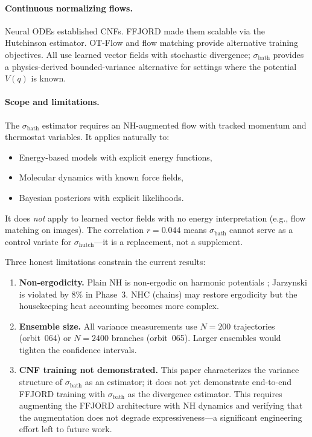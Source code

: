 \documentclass[11pt]{article}
\newcommand{\sbath}{\sigma_{\mathrm{bath}}}
\newcommand{\shutch}{\sigma_{\mathrm{hutch}}}
\begin{document}
\paragraph{Continuous normalizing flows.}
Neural ODEs \citep{chen2018neural} established CNFs. FFJORD
\citep{grathwohl2019ffjord} made them scalable via the Hutchinson estimator.
OT-Flow \citep{onken2021ot} and flow matching \citep{lipman2023flow} provide
alternative training objectives. All use learned vector fields with stochastic
divergence; $\sbath$ provides a physics-derived bounded-variance alternative
for settings where the potential $V(q)$ is known.

\paragraph{Scope and limitations.}
The $\sbath$ estimator requires an NH-augmented flow with tracked momentum and
thermostat variables. It applies naturally to:
\begin{itemize}[leftmargin=*, itemsep=1pt]
  \item Energy-based models with explicit energy functions,
  \item Molecular dynamics with known force fields,
  \item Bayesian posteriors with explicit likelihoods.
\end{itemize}
It does \emph{not} apply to learned vector fields with no energy interpretation
(e.g., flow matching on images). The correlation $r = 0.044$ means $\sbath$
cannot serve as a control variate for $\shutch$---it is a replacement, not
a supplement.

Three honest limitations constrain the current results:
\begin{enumerate}[leftmargin=*, itemsep=1pt]
  \item \textbf{Non-ergodicity.} Plain NH is non-ergodic on harmonic
    potentials \citep{legoll2009nonergodicity}; Jarzynski is violated by $8\%$
    in Phase~3. NHC (chains) may restore ergodicity but the housekeeping heat
    accounting becomes more complex.
  \item \textbf{Ensemble size.} All variance measurements use $N = 200$
    trajectories (orbit~064) or $N = 2400$ branches (orbit~065). Larger
    ensembles would tighten the confidence intervals.
  \item \textbf{CNF training not demonstrated.} This paper characterizes the
    variance structure of $\sbath$ as an estimator; it does not yet demonstrate
    end-to-end FFJORD training with $\sbath$ as the divergence estimator. This
    requires augmenting the FFJORD architecture with NH dynamics and verifying
    that the augmentation does not degrade expressiveness---a significant
    engineering effort left to future work.
\end{enumerate}
\end{document}
